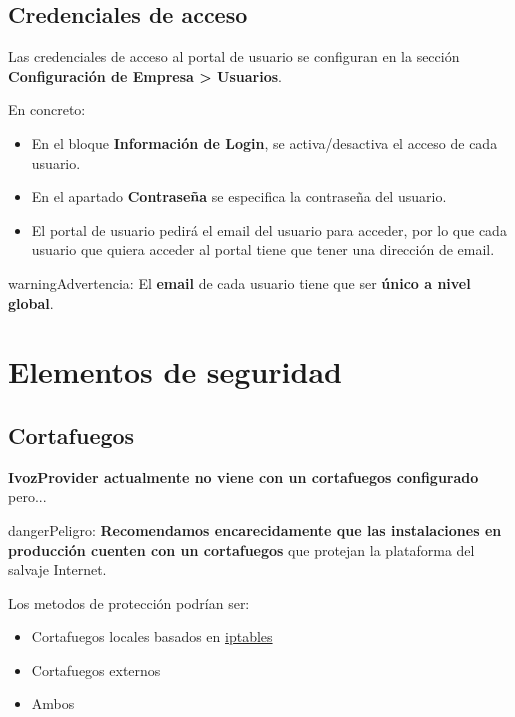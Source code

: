 \documentclass[letterpaper,10pt,spanish]{sphinxmanual}
\begin{document}
\section{Credenciales de acceso}
\label{userportal/index:access-credentials}
Las credenciales de acceso al portal de usuario se configuran en la sección \textbf{Configuración de Empresa \textgreater{} Usuarios}.

En concreto:
\begin{itemize}
\item {} 
En el bloque \textbf{Información de Login}, se activa/desactiva el acceso de cada usuario.

\item {} 
En el apartado \textbf{Contraseña} se especifica la contraseña del usuario.

\item {} 
El portal de usuario pedirá el email del usuario para acceder, por lo que cada usuario que quiera acceder al portal tiene que tener una dirección de email.

\end{itemize}

\begin{notice}{warning}{Advertencia:}
El \textbf{email} de cada usuario tiene que ser \textbf{único a nivel global}.
\end{notice}


\chapter{Elementos de seguridad}
\label{security/index:security-elements}\label{security/index::doc}

\section{Cortafuegos}
\label{security/index:firewall}
\textbf{IvozProvider actualmente no viene con un cortafuegos configurado} pero...

\begin{notice}{danger}{Peligro:}
\textbf{Recomendamos encarecidamente que las instalaciones en producción cuenten con un cortafuegos} que protejan la plataforma del salvaje Internet.
\end{notice}

Los metodos de protección podrían ser:
\begin{itemize}
\item {} 
Cortafuegos locales basados en \href{https://www.netfilter.org/}{iptables}

\item {} 
Cortafuegos externos

\item {} 
Ambos

\end{itemize}
\end{document}
